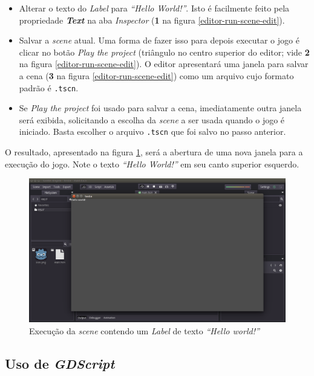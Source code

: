 \begin{itemize}
\item Alterar o texto do \textit{Label} para \textit{``Hello World!''}. Isto é facilmente feito pela propriedade \textbf{\textit{Text}} na aba \textit{Inspector} (\textbf{1} na figura \ref{editor-run-scene-edit}).

\item Salvar a \textit{scene} atual. Uma forma de fazer isso para depois executar o jogo é clicar no botão \textit{Play the project} (triângulo no centro superior do editor; vide \textbf{2} na figura \ref{editor-run-scene-edit}). O editor apresentará uma janela para salvar a cena (\textbf{3} na figura \ref{editor-run-scene-edit}) como um arquivo cujo formato padrão é \texttt{.tscn}.

\item Se \textit{Play the project} foi usado para salvar a cena, imediatamente outra janela será exibida, solicitando a escolha da \textit{scene} a ser usada quando o jogo é iniciado. Basta escolher o arquivo \texttt{.tscn} que foi salvo no passo anterior.
\end{itemize}

O resultado, apresentado na figura \ref{editor-hello-world}, será a abertura de uma nova janela para a execução do jogo. Note o texto \textit{``Hello World!''} em seu canto superior esquerdo.

\begin{figure}[H]
  \centering
  \includegraphics[width=.9\textwidth]{image/editor-hello-world}
  \caption{Execução da \textit{scene} contendo um \textit{Label} de texto \textit{``Hello world!''}}
  \label{editor-hello-world}
\end{figure}


\subsection{Uso de \textit{GDScript}}

